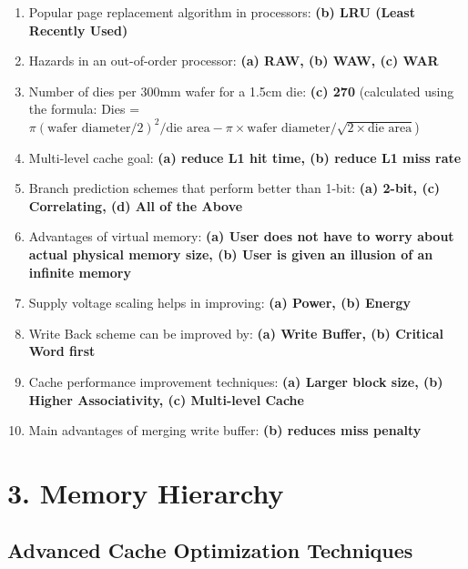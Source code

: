 \documentclass[12pt]{article}
\begin{document}
\begin{enumerate}
    \item Popular page replacement algorithm in processors: \textbf{(b) LRU (Least Recently Used)}
    
    \item Hazards in an out-of-order processor: \textbf{(a) RAW, (b) WAW, (c) WAR}
    
    \item Number of dies per 300mm wafer for a 1.5cm die: \textbf{(c) 270} (calculated using the formula: Dies = $\pi(\text{wafer diameter}/2)^2/\text{die area} - \pi\times\text{wafer diameter}/\sqrt{2\times\text{die area}}$)
    
    \item Multi-level cache goal: \textbf{(a) reduce L1 hit time, (b) reduce L1 miss rate}
    
    \item Branch prediction schemes that perform better than 1-bit: \textbf{(a) 2-bit, (c) Correlating, (d) All of the Above}
    
    \item Advantages of virtual memory: \textbf{(a) User does not have to worry about actual physical memory size, (b) User is given an illusion of an infinite memory}
    
    \item Supply voltage scaling helps in improving: \textbf{(a) Power, (b) Energy}
    
    \item Write Back scheme can be improved by: \textbf{(a) Write Buffer, (b) Critical Word first}
    
    \item Cache performance improvement techniques: \textbf{(a) Larger block size, (b) Higher Associativity, (c) Multi-level Cache}
    
    \item Main advantages of merging write buffer: \textbf{(b) reduces miss penalty}
\end{enumerate}

\section*{3. Memory Hierarchy}

\subsection*{Advanced Cache Optimization Techniques}
\end{document}
